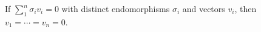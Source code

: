 If $\sum_1^n \sigma_i v_i = 0$ with distinct endomorphisms $\sigma_i$ and vectors $v_i$, then $v_1 = \cdots = v_n = 0$.
